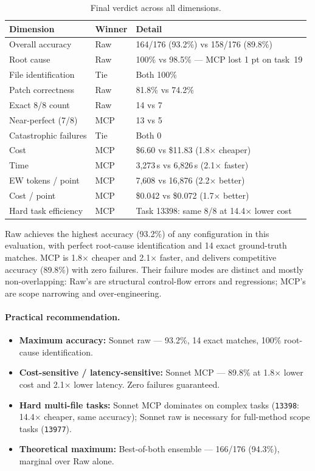 \begin{table}[h]
\centering
\caption{Final verdict across all dimensions.}\label{tab:verdict-sonnet}
\begin{tabular}{lll}
\toprule
\textbf{Dimension} & \textbf{Winner} & \textbf{Detail} \\
\midrule
Overall accuracy       & Raw   & 164/176 (93.2\%) vs 158/176 (89.8\%) \\
Root cause             & Raw   & 100\% vs 98.5\% --- MCP lost 1 pt on task~19 \\
File identification    & Tie   & Both 100\% \\
Patch correctness      & Raw   & 81.8\% vs 74.2\% \\
Exact 8/8 count        & Raw   & 14 vs 7 \\
Near-perfect (7/8)     & MCP   & 13 vs 5 \\
Catastrophic failures  & Tie   & Both 0 \\
Cost                   & MCP   & \$6.60 vs \$11.83 (1.8$\times$ cheaper) \\
Time                   & MCP   & 3{,}273\,s vs 6{,}826\,s (2.1$\times$ faster) \\
EW tokens / point      & MCP   & 7{,}608 vs 16{,}876 (2.2$\times$ better) \\
Cost / point           & MCP   & \$0.042 vs \$0.072 (1.7$\times$ better) \\
Hard task efficiency   & MCP   & Task 13398: same 8/8 at 14.4$\times$ lower cost \\
\bottomrule
\end{tabular}
\end{table}

\noindent
Raw achieves the highest accuracy (93.2\%) of any configuration in this
evaluation, with perfect root-cause identification and 14 exact
ground-truth matches.
MCP is 1.8$\times$ cheaper and 2.1$\times$ faster, and delivers
competitive accuracy (89.8\%) with zero failures.
Their failure modes are distinct and mostly non-overlapping: Raw's are
structural control-flow errors and regressions; MCP's are scope
narrowing and over-engineering.

\paragraph{Practical recommendation.}
\begin{itemize}
  \item \textbf{Maximum accuracy:} Sonnet raw --- 93.2\%, 14 exact
        matches, 100\% root-cause identification.
  \item \textbf{Cost-sensitive / latency-sensitive:} Sonnet MCP ---
        89.8\% at 1.8$\times$ lower cost and 2.1$\times$ lower latency.
        Zero failures guaranteed.
  \item \textbf{Hard multi-file tasks:} Sonnet MCP dominates on complex
        tasks (\texttt{13398}: 14.4$\times$ cheaper, same accuracy);
        Sonnet raw is necessary for full-method scope tasks
        (\texttt{13977}).
  \item \textbf{Theoretical maximum:} Best-of-both ensemble ---
        166/176 (94.3\%), marginal over Raw alone.
\end{itemize}
